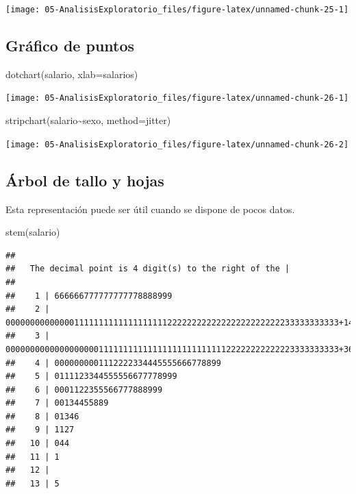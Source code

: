 \documentclass[
]{book}
\newenvironment{Shaded}{\begin{snugshade}}{\end{snugshade}}
\newcommand{\AttributeTok}[1]{\textcolor[rgb]{0.77,0.63,0.00}{#1}}
\newcommand{\FunctionTok}[1]{\textcolor[rgb]{0.00,0.00,0.00}{#1}}
\newcommand{\NormalTok}[1]{#1}
\newcommand{\SpecialCharTok}[1]{\textcolor[rgb]{0.00,0.00,0.00}{#1}}
\newcommand{\StringTok}[1]{\textcolor[rgb]{0.31,0.60,0.02}{#1}}
\theoremstyle{break}
\theoremstyle{nonumberplain}
\begin{document}
\begin{center}\texttt{[image: 05-AnalisisExploratorio\_files/figure-latex/unnamed-chunk-25-1]} \end{center}

\hypertarget{gruxe1fico-de-puntos}{%
\subsection{Gráfico de puntos}\label{gruxe1fico-de-puntos}}

\begin{Shaded}
\begin{Highlighting}[]
\FunctionTok{dotchart}\NormalTok{(salario, }\AttributeTok{xlab=}\StringTok{\textquotesingle{}salarios\textquotesingle{}}\NormalTok{)}
\end{Highlighting}
\end{Shaded}

\begin{center}\texttt{[image: 05-AnalisisExploratorio\_files/figure-latex/unnamed-chunk-26-1]} \end{center}

\begin{Shaded}
\begin{Highlighting}[]
\FunctionTok{stripchart}\NormalTok{(salario}\SpecialCharTok{\textasciitilde{}}\NormalTok{sexo, }\AttributeTok{method=}\StringTok{\textquotesingle{}jitter\textquotesingle{}}\NormalTok{)}
\end{Highlighting}
\end{Shaded}

\begin{center}\texttt{[image: 05-AnalisisExploratorio\_files/figure-latex/unnamed-chunk-26-2]} \end{center}

\hypertarget{uxe1rbol-de-tallo-y-hojas}{%
\subsection{Árbol de tallo y hojas}\label{uxe1rbol-de-tallo-y-hojas}}

Esta representación puede ser útil cuando se dispone de pocos datos.

\begin{Shaded}
\begin{Highlighting}[]
\FunctionTok{stem}\NormalTok{(salario)}
\end{Highlighting}
\end{Shaded}

\begin{verbatim}
## 
##   The decimal point is 4 digit(s) to the right of the |
## 
##    1 | 666666777777777778888999
##    2 | 00000000000000111111111111111111122222222222222222222222233333333333+148
##    3 | 00000000000000000001111111111111111111111111122222222222223333333333+36
##    4 | 0000000001112222334445555666778899
##    5 | 0111123344555556677778999
##    6 | 0001122355566777888999
##    7 | 00134455889
##    8 | 01346
##    9 | 1127
##   10 | 044
##   11 | 1
##   12 | 
##   13 | 5
\end{verbatim}
\end{document}
